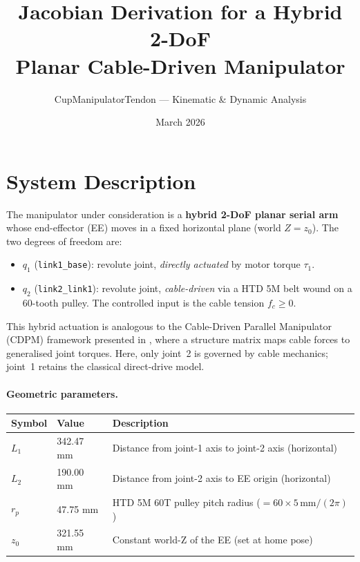 \documentclass[12pt, a4paper]{article}
\theoremstyle{definition}
\begin{document}
\title{%
  Jacobian Derivation for a Hybrid 2-DoF\\
  Planar Cable-Driven Manipulator%
}
\author{CupManipulatorTendon --- Kinematic \& Dynamic Analysis}
\date{March 2026}
\maketitle
\tableofcontents
\newpage

\section{System Description}
\label{sec:system}

The manipulator under consideration is a \textbf{hybrid 2-DoF planar serial arm}
whose end-effector (EE) moves in a fixed horizontal plane (world $Z = z_0$).  The
two degrees of freedom are:

\begin{itemize}[leftmargin=2em]
  \item $q_1$ (\texttt{link1\_base}): revolute joint, \emph{directly actuated} by
        motor torque $\tau_1$.
  \item $q_2$ (\texttt{link2\_link1}): revolute joint, \emph{cable-driven} via a
        HTD 5M belt wound on a 60-tooth pulley.  The controlled input is the cable
        tension $f_c \ge 0$.
\end{itemize}

\noindent
This hybrid actuation is analogous to the Cable-Driven Parallel Manipulator (CDPM)
framework presented in \cite{pott2018cable}, where a structure matrix maps cable
forces to generalised joint torques.  Here, only joint~2 is governed by cable
mechanics; joint~1 retains the classical direct-drive model.

\paragraph{Geometric parameters.}
\begin{center}
  \renewcommand{\arraystretch}{1.3}
  \begin{tabular}{lll}
    \toprule
    Symbol & Value & Description \\
    \midrule
    $L_1$ & 342.47 mm & Distance from joint-1 axis to joint-2 axis (horizontal) \\
    $L_2$ & 190.00 mm & Distance from joint-2 axis to EE origin (horizontal) \\
    $r_p$ & 47.75 mm  & HTD 5M 60T pulley pitch radius ($= 60 \times 5\,\text{mm} / (2\pi)$) \\
    $z_0$ & 321.55 mm & Constant world-Z of the EE (set at home pose) \\
    \bottomrule
  \end{tabular}
\end{center}
\end{document}
